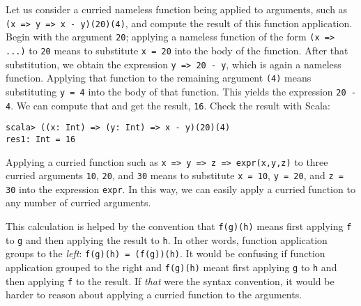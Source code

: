 Let us consider a curried nameless function being applied to arguments,
such as \lstinline!(x => y => x - y)(20)(4)!,
and compute the result of this function application. Begin with the
argument \lstinline!20!;
applying a nameless function of the form \lstinline!(x => ...)!
to \lstinline!20! means
to substitute \lstinline!x = 20!
into the body of the function. After that substitution, we obtain
the expression \lstinline!y => 20 - y!,
which is again a nameless function. Applying that function to the
remaining argument \lstinline!(4)!
means substituting \lstinline!y = 4!
into the body of that function. This yields the expression \lstinline!20 - 4!.
We can compute that and get the result, \lstinline!16!.
Check the result with Scala:
\begin{lstlisting}
scala> ((x: Int) => (y: Int) => x - y)(20)(4)
res1: Int = 16
\end{lstlisting}
Applying a curried function such as \lstinline!x => y => z => expr(x,y,z)!
to three curried arguments \lstinline!10!,
\lstinline!20!, and \lstinline!30!
means to substitute \lstinline!x = 10!,
\lstinline!y = 20!, and
\lstinline!z = 30! into
the expression \lstinline!expr!.
In this way, we can easily apply a curried function to any number
of curried arguments.

This calculation is helped by the convention that \lstinline!f(g)(h)!
means first applying \lstinline!f!
to \lstinline!g! and then
applying the result to \lstinline!h!.
In other words, function application groups to the \emph{left}: \lstinline!f(g)(h) = (f(g))(h)!.
It would be confusing if function application grouped to the right
and \lstinline!f(g)(h)!
meant first applying \lstinline!g!
to \lstinline!h! and then
applying \lstinline!f!
to the result. If \emph{that} were the syntax convention, it would
be harder to reason about applying a curried function to the arguments.

